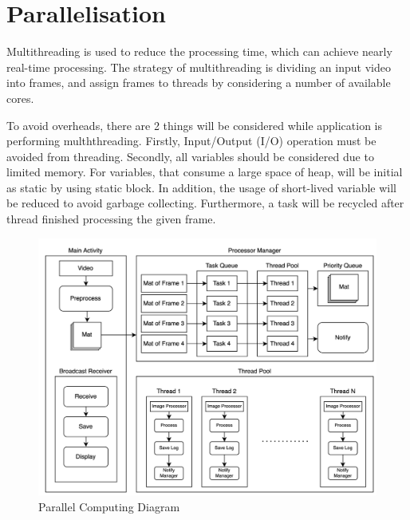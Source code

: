     \section{Parallelisation}
        Multithreading is used to reduce the processing time, which can achieve nearly real-time processing.
        The strategy of multithreading is dividing an input video into frames,
        and assign frames to threads by considering a number of available cores.

        To avoid overheads, there are 2 things will be considered while application is performing mulththreading.
        Firstly, Input/Output (I/O) operation must be avoided from threading.
        Secondly, all variables should be considered due to limited memory.
            For variables, that consume a large space of heap, will be initial as static by using static block.
            In addition, the usage of short-lived variable will be reduced to avoid garbage collecting.
            Furthermore, a task will be recycled after thread finished processing the given frame.

        \begin{figure}[!ht]
            \includegraphics[width=6in]{images/chapter3/parallel.png}
            \caption{Parallel Computing Diagram}
            \label{parallelJava}
        \end{figure}

